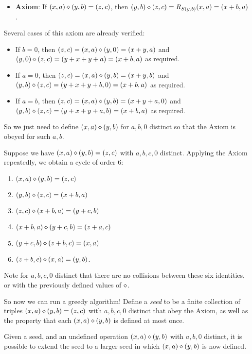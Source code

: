 \begin{itemize}
\item {\bf Axiom}: If $(x,a) \diamond (y,b) = (z,c)$, then $(y,b) \diamond (z,c) = R_{S(y,b)} (x,a) = (x+b,a)$.
\end{itemize}

Several cases of this axiom are already verified:
\begin{itemize}
\item If $b=0$, then $(z,c) = (x,a) \diamond (y,0) = (x+y,a)$ and $(y,0) \diamond (z,c) = (y+x+y+a) = (x+b,a)$ as required.
\item If $a=0$, then $(z,c) = (x,a) \diamond (y,b) = (x+y,b)$ and $(y,b) \diamond (z,c) = (y+x+y+b,0) = (x+b,a)$ as required.
\item If $a=b$, then $(z,c) = (x,a) \diamond (y,b) = (x+y+a,0)$ and $(y,b) \diamond (z,c) = (y+x+y+a,b) = (x+b,a)$ as required.
\end{itemize}

So we just need to define $(x,a) \diamond (y,b)$ for $a,b,0$ distinct so that the Axiom is obeyed for such $a,b$.

Suppose we have $(x,a) \diamond (y,b) = (z,c)$ with $a,b,c,0$ distinct.  Applying the Axiom repeatedly, we obtain a cycle of order $6$:
\begin{enumerate}
  \item $(x,a) \diamond (y,b) = (z,c)$
  \item $ (y,b) \diamond (z,c) = (x+b,a)$
  \item $ (z,c) \diamond (x+b,a) = (y+c,b)$
  \item $ (x+b,a) \diamond (y+c,b) = (z+a,c)$
  \item $ (y+c,b) \diamond (z+b,c) = (x,a)$
  \item $ (z+b,c) \diamond (x,a) = (y,b)$.
\end{enumerate}

Note for $a,b,c,0$ distinct that there are no collisions between these six identities, or with the previously defined values of $\diamond$.

So now we can run a greedy algorithm!  Define a \emph{seed} to be a finite collection of triples $(x,a) \diamond (y,b) = (z,c)$ with $a,b,c,0$ distinct that obey the Axiom, as well as the property that each $(x,a) \diamond (y,b)$ is defined at most once.

\begin{proposition}\label{enlarge-1323-seed}  Given a seed, and an undefined operation $(x,a) \diamond (y,b)$ with $a,b,0$ distinct, it is possible to extend the seed to a larger seed in which $(x,a) \diamond (y,b)$ is now defined.
\end{proposition}

